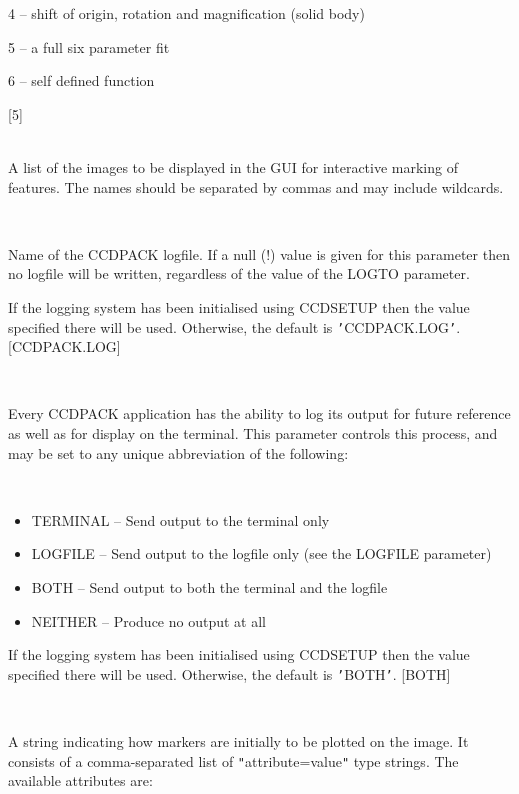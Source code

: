 \documentclass[twoside,11pt]{article}
\newcommand{\htmlref}[2]{#1}
\renewcommand{\_}{\texttt{\symbol{95}}}
\newcommand{\xroutine}[1]{\htmlref{{\sc #1}}{#1}}
\newcommand{\sstsubsection}[1]{ \item[{#1}] \mbox{} \\}
\newcommand{\sstitemlist}[1]{
  \mbox{} \\
  \vspace{-3.5ex}
  \begin{itemize}
     #1
  \end{itemize}
}
\newcommand{\sstitem}{\item}
\newcommand{\sstsubsection}[1]{\item[{#1}]}
\newcommand{\sstitemlist}[1]{
      \begin{itemize}
         #1
      \end{itemize}
      \\
   }
\newcommand{\sstitem}{\item}
\begin{document}
{{{{            \sstitem
               4 -- shift of origin, rotation and magnification (solid body)

            \sstitem
               5 -- a full six parameter fit

            \sstitem
               6 -- self defined function

         }
         [5]
      }
      \sstsubsection{
         IN = LITERAL (Read)
      }{
         A list of the images to be displayed in the GUI for interactive
         marking of features.  The names should be separated by commas
         and may include wildcards.
      }
      \sstsubsection{
         LOGFILE = FILENAME (Read)
      }{
         Name of the CCDPACK logfile.  If a null (!) value is given for
         this parameter then no logfile will be written, regardless of
         the value of the LOGTO parameter.

         If the logging system has been initialised using \xroutine{CCDSETUP}
         then the value specified there will be used. Otherwise, the
         default is {\tt '}CCDPACK.LOG{\tt '}.
         [CCDPACK.LOG]
      }
      \sstsubsection{
         LOGTO = LITERAL (Read)
      }{
         Every CCDPACK application has the ability to log its output
         for future reference as well as for display on the terminal.
         This parameter controls this process, and may be set to any
         unique abbreviation of the following:
         \sstitemlist{

            \sstitem
               TERMINAL  -- Send output to the terminal only

            \sstitem
               LOGFILE   -- Send output to the logfile only (see the
                               LOGFILE parameter)

            \sstitem
               BOTH      -- Send output to both the terminal and the
                               logfile

            \sstitem
               NEITHER   -- Produce no output at all

         }
         If the logging system has been initialised using \xroutine{CCDSETUP}
         then the value specified there will be used. Otherwise, the
         default is {\tt '}BOTH{\tt '}.
         [BOTH]
      }
      \sstsubsection{
         MARKSTYLE = LITERAL (Read and Write)
      }{
         A string indicating how markers are initially to be plotted on
         the image.  It consists of a comma-separated list of
         {\tt "}attribute=value{\tt "} type strings.  The available attributes are:
         \sstitemlist{

}}}}
\end{document}
